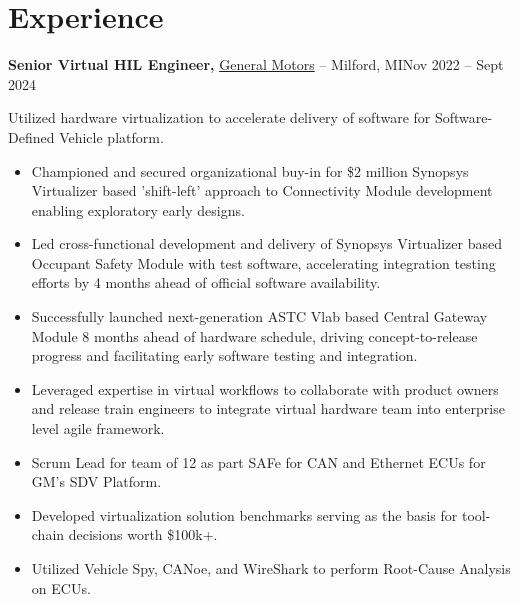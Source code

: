 \documentclass[11pt]{article}       %
\begin{document}
\section*{Experience}
\textbf{Senior Virtual HIL Engineer,} \href{}{General Motors} -- Milford, MI\hfill Nov 2022 -- Sept 2024\\
\vspace{-9pt}
\begin{flushleft}
  Utilized hardware virtualization to accelerate delivery of software for Software-Defined Vehicle platform.
\end{flushleft}
\vspace{-21pt}
\begin{itemize}
  \item Championed and secured organizational buy-in for \$2 million Synopsys Virtualizer based 'shift-left' approach to Connectivity Module development enabling exploratory early designs.
  \item Led cross-functional development and delivery of Synopsys Virtualizer based Occupant Safety Module with test software, accelerating integration testing efforts by 4 months ahead of official software availability.
  \item Successfully launched next-generation ASTC Vlab based Central Gateway Module 8 months ahead of hardware schedule, driving concept-to-release progress and facilitating early software testing and integration.
  \item Leveraged expertise in virtual workflows to collaborate with product owners and release train engineers to integrate virtual hardware team into enterprise level agile framework.
  \item Scrum Lead for team of 12 as part SAFe for CAN and Ethernet ECUs for GM’s SDV Platform.
  \item Developed virtualization solution benchmarks serving as the basis for tool-chain decisions worth \$100k+.
  \item Utilized Vehicle Spy, CANoe, and WireShark to perform Root-Cause Analysis on ECUs.
\end{itemize}
\end{document}
